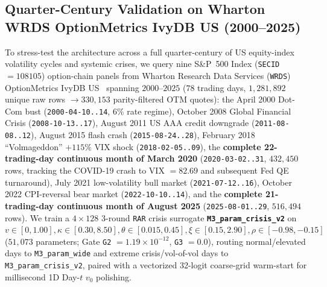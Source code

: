 \documentclass[preprint,12pt]{elsarticle}
\begin{document}
\subsection{Quarter-Century Validation on Wharton WRDS OptionMetrics IvyDB US (2000--2025)}
\label{sec:wrds}

To stress-test the architecture across a full quarter-century of US equity-index volatility cycles and systemic crises, we query nine S\&P~500 Index (\texttt{SECID} $= 108105$) option-chain panels from Wharton Research Data Services (\texttt{WRDS}) OptionMetrics IvyDB US~\cite{wrds2026} spanning $2000\text{--}2025$ ($78$ trading days, $1{,}281{,}892$ unique raw rows $\to 330{,}153$ parity-filtered OTM quotes): the April 2000 Dot-Com bust (\texttt{2000-04-10..14}, $6\%$ rate regime), October 2008 Global Financial Crisis (\texttt{2008-10-13..17}), August 2011 US AAA credit downgrade (\texttt{2011-08-08..12}), August 2015 flash crash (\texttt{2015-08-24..28}), February 2018 ``Volmageddon'' $+115\%$ VIX shock (\texttt{2018-02-05..09}), the \textbf{complete 22-trading-day continuous month of March 2020} (\texttt{2020-03-02..31}, $432{,}450$ rows, tracking the COVID-19 crash to VIX $= 82.69$ and subsequent Fed QE turnaround), July 2021 low-volatility bull market (\texttt{2021-07-12..16}), October 2022 CPI-reversal bear market (\texttt{2022-10-10..14}), and the \textbf{complete 21-trading-day continuous month of August 2025} (\texttt{2025-08-01..29}, $516{,}494$ rows). We train a $4 \times 128$ 3-round \texttt{RAR} crisis surrogate \textbf{\texttt{M3\_param\_crisis\_v2}} on $v \in [0, 1.00], \kappa \in [0.30, 8.50], \theta \in [0.015, 0.45], \xi \in [0.15, 2.90], \rho \in [-0.98, -0.15]$ ($51{,}073$ parameters; Gate \texttt{G2} $= 1.19 \times 10^{-12}$, \texttt{G3} $= 0.0$), routing normal/elevated days to \texttt{M3\_param\_wide} and extreme crisis/vol-of-vol days to \texttt{M3\_param\_crisis\_v2}, paired with a vectorized 32-logit coarse-grid warm-start for millisecond 1D Day-$t$ $v_0$ polishing.
\end{document}
